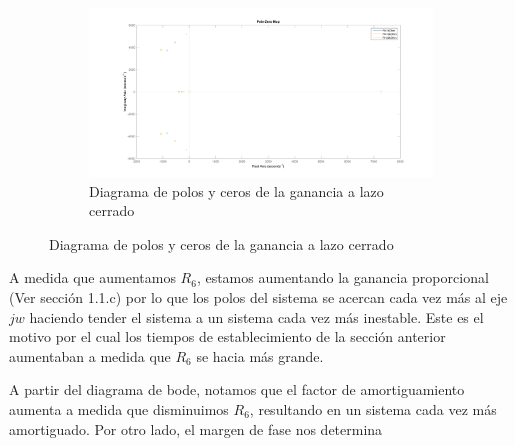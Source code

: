 \documentclass[e4_tp2_main.tex]{subfiles}
\begin{document}
\begin{figure}[H]
\begin{subfigure}[b]{0.5\textwidth}
    \includegraphics[width=\textwidth, height=\textwidth]{Imagenes/Punto1/polosyceros.png}
    \caption{ Diagrama de polos y ceros de la ganancia a lazo cerrado}
    \label{fig:f22}
  \end{subfigure}
\end{figure}  
  
  
A medida que aumentamos $R_6$, estamos aumentando la ganancia proporcional (Ver secci\'on 1.1.c) por lo que los polos del sistema se acercan cada vez m\'as al eje $jw$ haciendo tender el sistema a un sistema cada vez m\'as inestable. Este es el motivo por el cual los tiempos de establecimiento de la secci\'on anterior aumentaban a medida que $R_6$ se hacia m\'as grande. 

A partir del diagrama de bode, notamos que el factor de amortiguamiento aumenta a medida que disminuimos $R_6$, resultando en un sistema cada vez m\'as amortiguado. Por otro lado, el margen de fase nos determina 
\end{document}
